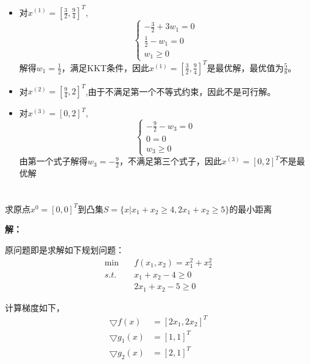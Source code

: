 \documentclass[a4paper]{article}
\begin{document}
\begin{itemize}
	
\item 对$x^{(1)}=\left[\frac{3}{2},\frac{9}{4}\right]^T$,
\begin{equation}
\left\{
\begin{array}{c}
-\frac{3}{2}+3w_1=0 \\
\frac{1}{2}-w_1=0 \\
w_1 \ge 0
\end{array}
\right.
\end{equation}
解得$w_1=\frac{1}{2}$，满足KKT条件，因此$x^{(1)}=\left[\frac{3}{2},\frac{9}{4}\right]^T$是最优解，最优值为$\frac{5}{8}$。

\item 对$x^{(2)}=\left[\frac{9}{4},2\right]^T$,由于不满足第一个不等式约束，因此不是可行解。

\item 对$x^{(3)}=[0,2]^T$,
\begin{equation}
\left\{
\begin{array}{c}
-\frac{9}{2}-w_3=0 \\
0=0 \\
w_3 \ge 0
\end{array}
\right.
\end{equation}
由第一个式子解得$w_3=-\frac{9}{2}$，不满足第三个式子，因此$x^{(3)}=[0,2]^T$不是最优解

\end{itemize}

\section{}
求原点$x^{0}=[0,0]^T$到凸集$S=\{x|x_1+x_2\ge4,2x_1+x_2\ge5\}$的最小距离

\textbf{解：}

原问题即是求解如下规划问题：
\begin{equation*}
\begin{aligned}
\min\quad &f(x_1,x_2)=x_1^2+x_2^2 \\
s.t.\quad &x_1+x_2-4\ge 0 \\
&2x_1+x_2-5 \ge 0
\end{aligned}
\end{equation*}

计算梯度如下，
\begin{equation}
\begin{aligned}
\bigtriangledown f(x) &=[2x_1,2x_2]^T \\
\bigtriangledown g_1(x)&=[1,1]^T \\
\bigtriangledown g_2(x)&=[2,1]^T
\end{aligned}
\end{equation}
\end{document}
